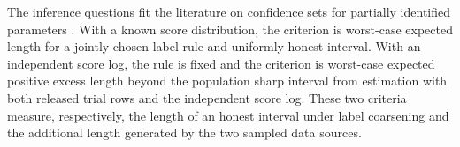 The inference questions fit the literature on confidence sets for partially identified parameters \citep{ImbensManski2004,Stoye2009,ChernozhukovHongTamer2007,KaidoMolinariStoye2019}. With a known score distribution, the criterion is worst-case expected length for a jointly chosen label rule and uniformly honest interval. With an independent score log, the rule is fixed and the criterion is worst-case expected positive excess length beyond the population sharp interval from estimation with both released trial rows and the independent score log. These two criteria measure, respectively, the length of an honest interval under label coarsening and the additional length generated by the two sampled data sources.
